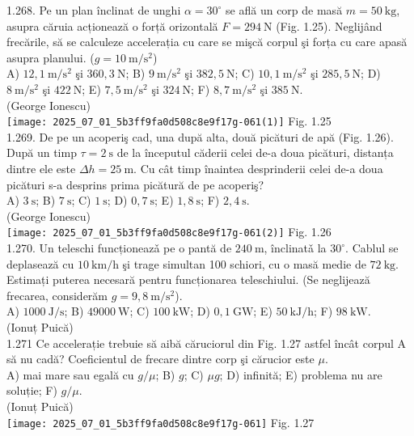 {1.268. Pe un plan înclinat de unghi $\alpha=30^{\circ}$ se află un corp de masă $m=50 \mathrm{~kg}$, asupra căruia acționează o forță orizontală $F=294 \mathrm{~N}$ (Fig. 1.25). Neglijând frecările, să se calculeze accelerația cu care se mişcă corpul şi forța cu care apasă asupra planului. ($g=10 \mathrm{~m} / \mathrm{s}^{2}$)\\ A) $12,1 \mathrm{~m} / \mathrm{s}^{2}$ şi $360,3 \mathrm{~N}$; B) $9 \mathrm{~m} / \mathrm{s}^{2}$ şi $382,5 \mathrm{~N}$; C) $10,1 \mathrm{~m} / \mathrm{s}^{2}$ şi $285,5 \mathrm{~N}$; D) $8 \mathrm{~m} / \mathrm{s}^{2}$ şi $422 \mathrm{~N}$; E) $7,5 \mathrm{~m} / \mathrm{s}^{2}$ şi $324 \mathrm{~N}$; F) $8,7 \mathrm{~m} / \mathrm{s}^{2}$ şi $385 \mathrm{~N}$.\\ (George Ionescu)\\ \texttt{[image: 2025\_07\_01\_5b3ff9fa0d508c8e9f17g-061(1)]} Fig. 1.25\\

1.269. De pe un acoperiş cad, una după alta, două picături de apă (Fig. 1.26). După un timp $\tau=2 \mathrm{~s}$ de la începutul căderii celei de-a doua picături, distanța dintre ele este $\Delta h=25 \mathrm{~m}$. Cu cât timp înaintea desprinderii celei de-a doua picături s-a desprins prima picătură de pe acoperiş?\\ A) $3 \mathrm{~s}$; B) $7 \mathrm{~s}$; C) $1 \mathrm{~s}$; D) $0,7 \mathrm{~s}$; E) $1,8 \mathrm{~s}$; F) $2,4 \mathrm{~s}$.\\ (George Ionescu)\\ \texttt{[image: 2025\_07\_01\_5b3ff9fa0d508c8e9f17g-061(2)]} Fig. 1.26\\

1.270. Un teleschi funcționeazǎ pe o pantă de $240 \mathrm{~m}$, înclinatǎ la $30^{\circ}$. Cablul se deplasează cu $10 \mathrm{~km} / \mathrm{h}$ şi trage simultan 100 schiori, cu o masă medie de $72 \mathrm{~kg}$. Estimați puterea necesară pentru funcționarea teleschiului. (Se neglijează frecarea, considerăm $g=9,8 \mathrm{~m} / \mathrm{s}^{2}$).\\ A) $1000 \mathrm{~J} / \mathrm{s}$; B) $49000 \mathrm{~W}$; C) $100 \mathrm{~kW}$; D) $0,1 \mathrm{~GW}$; E) $50 \mathrm{~kJ} / \mathrm{h}$; F) $98 \mathrm{~kW}$.\\ (Ionuț Puică)\\

1.271 Ce accelerație trebuie să aibă căruciorul din Fig. 1.27 astfel încât corpul A să nu cadă? Coeficientul de frecare dintre corp şi cărucior este $\mu$.\\ A) mai mare sau egală cu $g / \mu$; B) $g$; C) $\mu g$; D) infinită; E) problema nu are soluție; F) $g / \mu$.\\ (Ionuț Puică)\\ \texttt{[image: 2025\_07\_01\_5b3ff9fa0d508c8e9f17g-061]} Fig. 1.27\\

}
